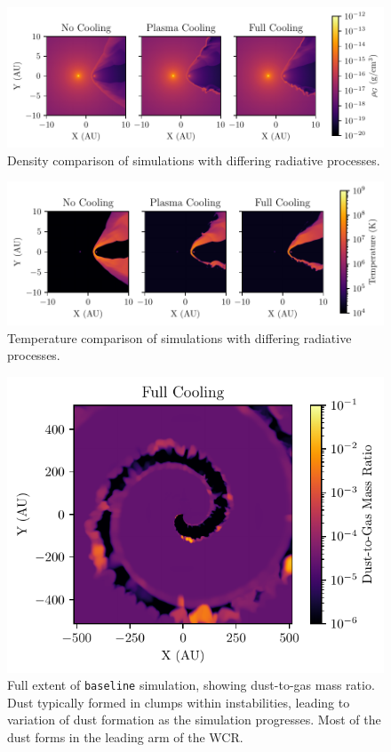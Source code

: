 \begin{figure}
  \centering
  \includegraphics{assets/results/radiative/radiative-crop-2-rho.pdf}
  \caption[Density comparison of simulations with differing radiative processes]{Density comparison of simulations with differing radiative processes.}
  \label{fig:postshockcompression}
\end{figure}

\begin{figure}
  \centering
  \includegraphics{assets/results/radiative/radiative-crop-2-temp.pdf}
  \caption[Temperature comparison of simulations with differing radiative processes]{Temperature comparison of simulations with differing radiative processes.}
  \label{fig:postshocktemperature}
\end{figure}

\begin{figure}
  \centering
  \includegraphics{assets/results/radiative/z.pdf}
  \caption[\texttt{Baseline} simulation $z$, full extent]{Full extent of \texttt{baseline} simulation, showing dust-to-gas mass ratio. Dust typically formed in clumps within instabilities, leading to variation of dust formation as the simulation progresses. Most of the dust forms in the leading arm of the WCR.}
  \label{fig:full-radiative-z}
\end{figure}


